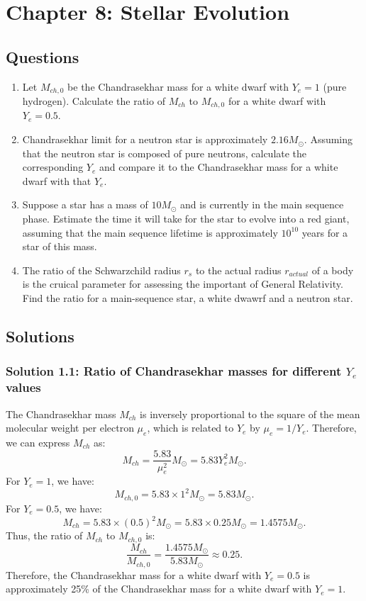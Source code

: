 \section{Chapter 8: Stellar Evolution}
\subsection{Questions}
\begin{enumerate}
\item Let $M_{ch,0}$ be the Chandrasekhar mass for a white dwarf with $Y_e = 1$ (pure hydrogen). Calculate the ratio of $M_{ch}$ to $M_{ch,0}$ for a white dwarf with $Y_e = 0.5$.
\item Chandrasekhar limit for a neutron star is approximately $2.16 M_\odot$. Assuming that the neutron star is composed of pure neutrons, 
calculate the corresponding $Y_e$ and compare it to the Chandrasekhar mass for a white dwarf with that $Y_e$.
\item Suppose a star has a mass of $10 M_\odot$ and is currently in the main sequence phase. 
Estimate the time it will take for the star to evolve into a red giant, assuming that the main sequence lifetime is approximately $10^{10}$ years for a star of this mass. 
\item The ratio of the Schwarzchild radius $r_s$ to the actual radius $r_{actual}$ of a body is the cruical  parameter for assessing the important of General Relativity. Find the ratio for a main-sequence star, a white dwawrf and a neutron star.
\end{enumerate}

\subsection{Solutions}
\subsubsection*{Solution 1.1: Ratio of Chandrasekhar masses for different $Y_e$ values}

The Chandrasekhar mass $M_{ch}$ is inversely proportional to the square of the mean molecular weight per electron $\mu_e$, which is related to $Y_e$ by $\mu_e = 1/Y_e$. Therefore, we can express $M_{ch}$ as:
\begin{equation}   
M_{ch} = \frac{5.83}{\mu_e^2} M_\odot = 5.83 Y_e^2 M_\odot.
\end{equation}
For $Y_e = 1$, we have:
\begin{equation}
M_{ch,0} = 5.83 \times 1^2 M_\odot = 5.83 M_\odot.
\end{equation}
For $Y_e = 0.5$, we have:
\begin{equation}
M_{ch} = 5.83 \times (0.5)^2 M_\odot = 5.83 \times 0.25 M_\odot = 1.4575 M_\odot.
\end{equation}
Thus, the ratio of $M_{ch}$ to $M_{ch,0}$ is:
\begin{equation}
\frac{M_{ch}}{M_{ch,0}} = \frac{1.4575 M_\odot}{5.83 M_\odot} \approx 0.25.
\end{equation}
Therefore, the Chandrasekhar mass for a white dwarf with $Y_e = 0.5$ is approximately 25\% of the Chandrasekhar mass for a white dwarf with $Y_e = 1$.

